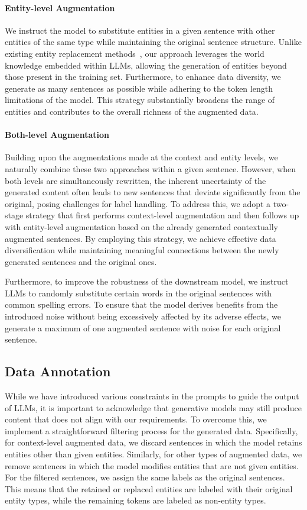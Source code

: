 \documentclass[11pt]{article}
\begin{document}
\paragraph{Entity-level Augmentation}
We instruct the model to substitute entities in a given sentence with other entities of the same type while maintaining the original sentence structure. Unlike existing entity replacement methods~\cite{LSMS, MELM}, our approach leverages the world knowledge embedded within LLMs, allowing the generation of entities beyond those present in the training set. Furthermore, to enhance data diversity, we generate as many sentences as possible while adhering to the token length limitations of the model. This strategy substantially broadens the range of entities and contributes to the overall richness of the augmented data.

\paragraph{Both-level Augmentation}
Building upon the augmentations made at the context and entity levels, we naturally combine these two approaches within a given sentence. However, when both levels are simultaneously rewritten, the inherent uncertainty of the generated content often leads to new sentences that deviate significantly from the original, posing challenges for label handling. To address this, we adopt a two-stage strategy that first performs context-level augmentation and then follows up with entity-level augmentation based on the already generated contextually augmented sentences. By employing this strategy, we achieve effective data diversification while maintaining meaningful connections between the newly generated sentences and the original ones.

Furthermore, to improve the robustness of the downstream model, we instruct LLMs to randomly substitute certain words in the original sentences with common spelling errors. To ensure that the model derives benefits from the introduced noise without being excessively affected by its adverse effects, we generate a maximum of one augmented sentence with noise for each original sentence.


\subsection{Data Annotation}

While we have introduced various constraints in the prompts to guide the output of LLMs, it is important to acknowledge that generative models may still produce content that does not align with our requirements. To overcome this, we implement a straightforward filtering process for the generated data.
Specifically, for context-level augmented data, we discard sentences in which the model retains entities other than given entities. Similarly, for other types of augmented data, we remove sentences in which the model modifies entities that are not given entities. For the filtered sentences, we assign the same labels as the original sentences. This means that the retained or replaced entities are labeled with their original entity types, while the remaining tokens are labeled as non-entity types.
\end{document}
